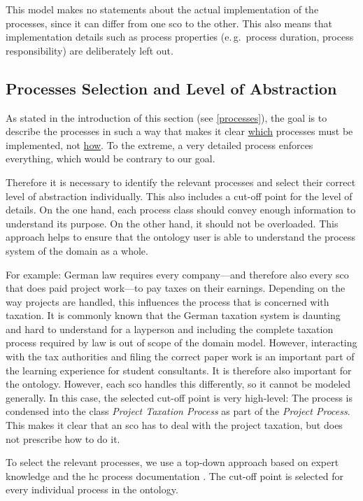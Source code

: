 \documentclass[a4paper, DIV=13, BCOR=0cm]{scrbook}
\newcommand{\eg}{e.\,g.\ }
\begin{document}
This model makes no statements about the actual implementation of the processes, since it can differ from one \gls{sco} to the other. This also means that implementation details such as process properties (\eg process duration, process responsibility) are deliberately left out.

\subsection{Processes Selection and Level of Abstraction}
As stated in the introduction of this section (see \autoref{processes}), the goal is to describe the processes in such a way that makes it clear \underline{which} processes must be implemented, not \underline{how}. To the extreme, a very detailed process enforces everything, which would be contrary to our goal.

Therefore it is necessary to identify the relevant processes and select their correct level of abstraction individually. This also includes a cut-off point for the level of details.  On the one hand, each process class should convey enough information to understand its purpose. On the other hand, it should not be overloaded. This approach helps to ensure that the ontology user is able to understand the process system of the domain as a whole.

For example: German law requires every company---and therefore also every \gls{sco} that does paid project work---to pay taxes on their earnings. Depending on the way projects are handled, this influences the process that is concerned with taxation. It is commonly known that the German taxation system is daunting and hard to understand for a layperson and including the complete taxation process required by law is out of scope of the domain model. However, interacting with the tax authorities and filing the correct paper work is an important part of the learning experience for student consultants. It is therefore also important for the ontology. However, each \gls{sco} handles this differently, so it cannot be modeled generally. In this case, the selected cut-off point is very high-level: The process is condensed into the class \textit{Project Taxation Process} as part of the \textit{Project Process}. This makes it clear that an \gls{sco} has to deal with the project taxation, but does not prescribe how to do it.

To select the relevant processes, we use a top-down approach based on expert knowledge and the \gls{hc} process documentation \cite{hc-prozesshandbuch}. The cut-off point is selected for every individual process in the ontology.
\end{document}

